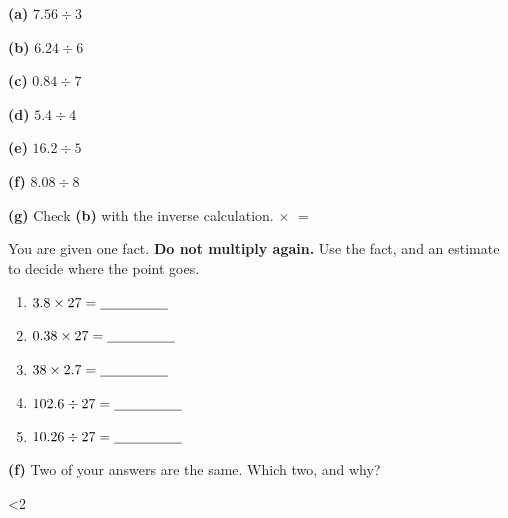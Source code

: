 \documentclass[12pt,a4paper]{article}
\makeatletter
\newif\iffr
\newcommand{\fr}[1]{\unskip\iffr\par\vspace{1pt}\noindent{\small\itshape\color{black!60}#1}\par\fi}
\newcommand{\wsq}[3][3.1cm]{%
  \begin{minipage}[t]{0.315\textwidth}
    \textbf{(#2)}\; $#3$
    \begin{workspace}[#1]\end{workspace}
  \end{minipage}}
\renewcommand{\wlines}[1]{%
    \par\vspace{0.75em}%
    \@tempcnta=0\relax
    \@whilenum\@tempcnta<#1\do{%
      \hbox to \linewidth{\color{rulegray}\leaders\hrule height 0.5pt\hfill}%
      \vspace{1.9em}%
      \advance\@tempcnta by 1\relax}%
    \par\vspace{-0.8em}}
\makeatother
\begin{document}
\vspace{4pt}
\noindent
\wsq[2.45cm]{a}{7.56 \div 3}\hfill\wsq[2.45cm]{b}{6.24 \div 6}\hfill\wsq[2.45cm]{c}{0.84 \div 7}

\vspace{4pt}
\noindent
\wsq[2.45cm]{d}{5.4 \div 4}\hfill\wsq[2.45cm]{e}{16.2 \div 5}\hfill\wsq[2.45cm]{f}{8.08 \div 8}

\vspace{4pt}
\noindent \textbf{(g)} Check \textbf{(b)} with the inverse calculation. \hfill
\blank[2.2cm] $\times$ \blank[1.4cm] $=$ \blank[2.2cm]
\fr{(g) V\'erifie (b) avec l'op\'eration inverse.}


\noindent\begin{minipage}{\textwidth}
You are given one fact. \textbf{Do not multiply again.} Use the fact, and an
estimate to decide where the point goes.
\fr{On te donne un seul r\'esultat. \textbf{Ne refais pas la multiplication~:}
utilise ce r\'esultat et une estimation pour placer la virgule.}

\vspace{6pt}
\begin{center}
\end{center}

\vspace{4pt}
\begin{multicols}{3}
\begin{enumerate}[label=(\alph*), itemsep=12pt]
  \item $3.8 \times 27 = \blank[1.7cm]$
  \item $0.38 \times 27 = \blank[1.7cm]$
  \item $38 \times 2.7 = \blank[1.7cm]$
  \item $102.6 \div 27 = \blank[1.7cm]$
  \item $10.26 \div 27 = \blank[1.7cm]$
\end{enumerate}
\end{multicols}
\end{minipage}

\vspace{10pt}
\noindent\begin{minipage}{\textwidth}
\textbf{(f)} Two of your answers are the same. Which two, and why?
\fr{Deux de tes r\'eponses sont identiques. Lesquelles~? Pourquoi~?}
\wlines{2}
\end{minipage}
\end{document}
